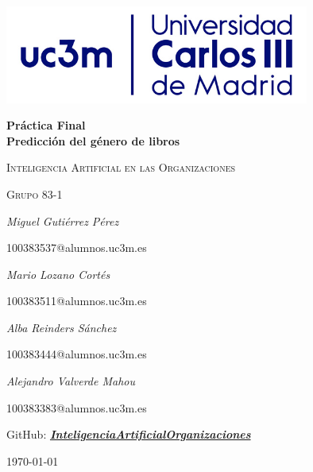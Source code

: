\documentclass[12pt,a4paper, xcolor=table]{article}
\begin{document}
\setlength{\parindent}{0pt}
\begin{titlepage}
        \centering
        \includegraphics[width=0.75\textwidth]{img/logo_uc3m.jpg}\par\vspace{2cm}
        {\huge\bfseries Práctica Final \\ Predicción del género de libros\par}
        \vspace{0.5cm}
        {\scshape\Large Inteligencia Artificial en las Organizaciones\par}
        \vspace{1.5cm}
        {\scshape\Large Grupo 83-1\par}
        \vspace{1.5cm}
        {\Large\itshape Miguel Gutiérrez Pérez\par}
        {\Large 100383537@alumnos.uc3m.es \par}
        \vspace{1cm}
        {\Large\itshape Mario Lozano Cortés\par}
        {\Large 100383511@alumnos.uc3m.es\par}
        \vspace{1cm}
        {\Large\itshape Alba Reinders Sánchez\par}
        {\Large 100383444@alumnos.uc3m.es\par}
        \vspace{1cm}
        {\Large\itshape Alejandro Valverde Mahou\par}
        {\Large 100383383@alumnos.uc3m.es\par}
        \vspace{5mm}
        {\large GitHub: \textbf{\textit{\href{https://github.com/Pheithar/InteligenciaArtificialOrganizaciones}{InteligenciaArtificialOrganizaciones}}}}
        \vfill

        {\large \today\par}
\end{titlepage}

\tableofcontents

\listoffigures
\end{document}
